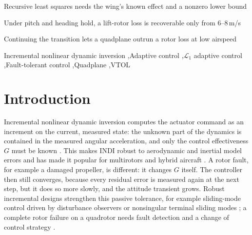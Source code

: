 \documentclass[preprint,12pt,a4paper]{elsarticle}
\begin{document}
\begin{frontmatter}
\begin{highlights}
\item Recursive least squares needs the wing's known effect and a nonzero lower bound
\item Under pitch and heading hold, a lift-rotor loss is recoverable only from 6--8\,m/s
\item Continuing the transition lets a quadplane outrun a rotor loss at low airspeed
\end{highlights}
\begin{keyword}
Incremental nonlinear dynamic inversion \sep Adaptive control \sep $\mathcal{L}_1$ adaptive control \sep Fault-tolerant control \sep Quadplane \sep VTOL
\end{keyword}
\end{frontmatter}


\section{Introduction}
Incremental nonlinear dynamic inversion computes the actuator command as an increment on the current, measured
state: the unknown part of the dynamics is contained in the measured angular acceleration, and only the control
effectiveness $G$ must be known \cite{sieberling2010,smeur2016}. This makes INDI robust to aerodynamic and inertial model
errors and has made it popular for multirotors and hybrid aircraft \cite{smeur2016,sun2020,smeur2020,deponti2023,deponti2025}. A rotor fault,
for example a damaged propeller, is different: it changes $G$ itself. The controller then still converges, because
every residual error is measured again at the next step, but it does so more slowly, and the attitude transient grows.
Robust incremental designs strengthen this passive tolerance, for example sliding-mode control driven by disturbance observers
\cite{wang2019smdo} or nonsingular terminal sliding modes \cite{wang2019ntsmc}; a complete rotor failure on a quadrotor needs
fault detection and a change of control strategy \cite{lu2015,mueller2014}.
\end{document}
